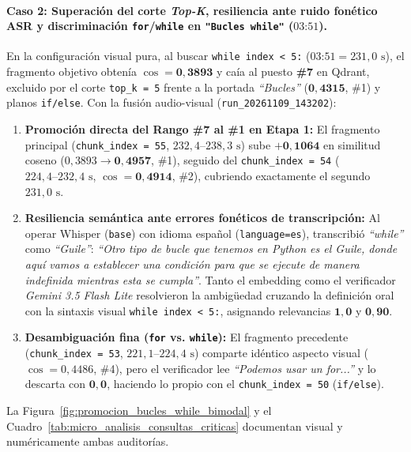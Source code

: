 \paragraph{Caso 2: Superación del corte \textit{Top-K}, resiliencia ante ruido fonético ASR y discriminación \texttt{for}/\texttt{while} en \texttt{\string"Bucles while\string"} ($03\text{:}51$).}
En la configuración visual pura, al buscar \texttt{while index < 5:} ($03\text{:}51 = 231,0\text{ s}$), el fragmento objetivo obtenía $\cos = \mathbf{0,3893}$ y caía al puesto \textbf{\#7} en Qdrant, excluido por el corte \texttt{top\_k = 5} frente a la portada \textit{``Bucles''} ($\mathbf{0,4315}$, \#1) y planos \texttt{if/else}. Con la fusión audio-visual (\texttt{run\_20261109\_143202}):
\begin{enumerate}
    \item \textbf{Promoción directa del Rango \#7 al \#1 en Etapa 1:} El fragmento principal (\texttt{chunk\_index = 55}, $232,4\text{--}238,3\text{ s}$) sube $\mathbf{+0,1064}$ en similitud coseno ($0,3893 \to \mathbf{0,4957}$, \#1), seguido del \texttt{chunk\_index = 54} ($224,4\text{--}232,4\text{ s}$, $\cos = \mathbf{0,4914}$, \#2), cubriendo exactamente el segundo $231,0\text{ s}$.
    \item \textbf{Resiliencia semántica ante errores fonéticos de transcripción:} Al operar Whisper (\texttt{base}) con idioma español (\texttt{language=es}), transcribió \textit{``while''} como \textit{``Guile''}: \textit{``Otro tipo de bucle que tenemos en Python es el Guile, donde aquí vamos a establecer una condición para que se ejecute de manera indefinida mientras esta se cumpla''}. Tanto el embedding como el verificador \textit{Gemini 3.5 Flash Lite} resolvieron la ambigüedad cruzando la definición oral con la sintaxis visual \texttt{while index < 5:}, asignando relevancias $\mathbf{1,0}$ y $\mathbf{0,90}$.
    \item \textbf{Desambiguación fina (\texttt{for} vs. \texttt{while}):} El fragmento precedente (\texttt{chunk\_index = 53}, $221,1\text{--}224,4\text{ s}$) comparte idéntico aspecto visual ($\cos = 0,4486$, \#4), pero el verificador lee \textit{``Podemos usar un for...''} y lo descarta con $\mathbf{0,0}$, haciendo lo propio con el \texttt{chunk\_index = 50} (\texttt{if/else}).
\end{enumerate}

La Figura~\ref{fig:promocion_bucles_while_bimodal} y el Cuadro~\ref{tab:micro_analisis_consultas_criticas} documentan visual y numéricamente ambas auditorías.

